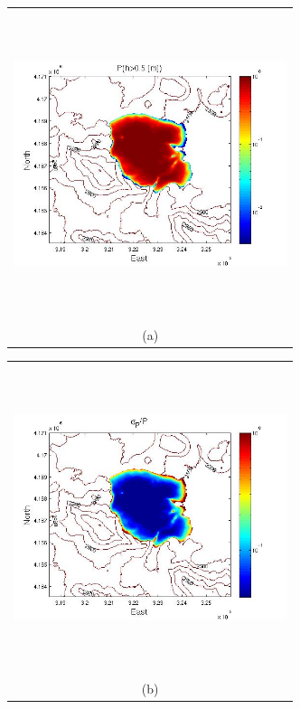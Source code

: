 \documentclass[12pt]{article}
\newcommand{\Pic}[2][0.85]{\begin{center}\texttt{[image: \#2]}
 \end{center} }
\begin{document}
\begin{figure}[H]
    \begin{minipage}[b]{0.6\textwidth}
        \begin{tabular}{c}
       \includegraphics[width=8cm,height=9cm,keepaspectratio]{figs/Mammoth_0_P_5m.jpg}\\
        (a)
        \end{tabular}
    \end{minipage}
    \begin{minipage}{0.6\textwidth}
        \begin{tabular}{c}
	\includegraphics[width=8cm,height=9cm,keepaspectratio]{figs/Mammoth_0_sigma_5m.jpg}\\
        (b)

\end{tabular}
\end{minipage}
\end{figure}
\end{document}
